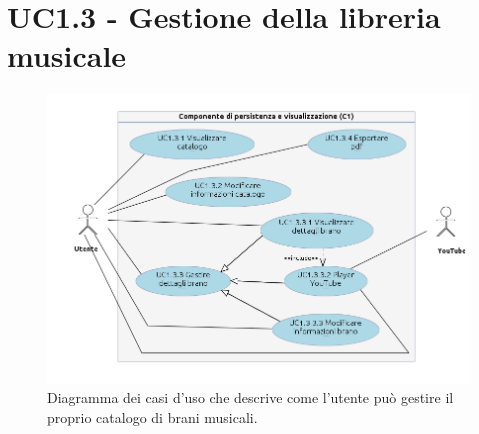 \section{UC1.3 - Gestione della libreria musicale}
\begin{figure}[h]
  \centering
  \includegraphics[width=18cm]{img/AR/UC1_3.png}
\caption{Diagramma dei casi d'uso che descrive come l'utente pu\`o gestire il
proprio catalogo di brani musicali.}
\end{figure}

